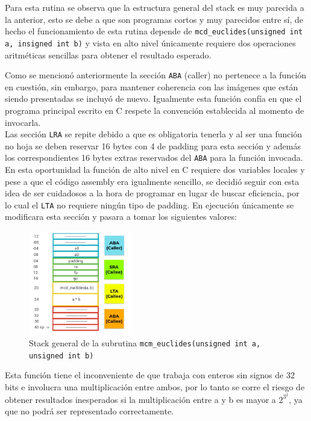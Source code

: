 \documentclass[titlepage,a4paper]{article}
\begin{document}
Para esta rutina se observa que la estructura general del stack es muy parecida a la anterior, esto se debe a que son programas cortos y muy parecidos entre sí, de hecho el funcionamiento de esta rutina depende de \verb|mcd_euclides(unsigned int a, insigned int b)| y vista en alto nivel únicamente requiere dos operaciones aritméticas sencillas para obtener el resultado esperado. 

Como se mencionó anteriormente la sección \verb|ABA| (caller) no pertenece a la función en cuestión, sin embargo, para mantener coherencia con las imágenes que están siendo presentadas se incluyó de nuevo. Igualmente esta función confía en que el programa principal escrito en C respete la convención establecida al momento de invocarla.\\ 

Las sección \verb|LRA| se repite debido a que es obligatoria tenerla y al ser una función no hoja se deben reservar 16 bytes con 4 de padding para esta sección y además los correspondientes 16 bytes extras reservados del \verb|ABA| para la función invocada.\\

En esta oportunidad la función de alto nivel en C requiere dos variables locales y pese a que el código assembly era igualmente sencillo, se decidió seguir con esta idea de ser cuidadosos a la hora de programar en lugar de buscar eficiencia, por lo cual el \verb|LTA| no requiere ningún tipo de padding. En ejecución únicamente se modificara esta sección y pasara a tomar los siguientes valores:

\begin{figure}[H]
\centering
\includegraphics[width=0.4\textwidth]{images/stackMcmEjec.jpeg}
\cprotect\caption{\label{fig:seq04}Stack general de la subrutina \verb|mcm_euclides(unsigned int a, unsigned int b)|}
\end{figure}

Esta función tiene el inconveniente de que trabaja con enteros sin signos de 32 bits e involucra una multiplicación entre ambos, por lo tanto se corre el riesgo de obtener resultados inesperados si la multiplicación entre a y b es mayor a $2^3^2$, ya que no podrá ser representado correctamente.
\end{document}

